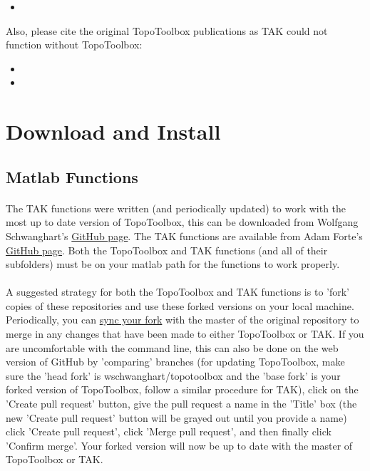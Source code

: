 \begin{itemize}
	\item {}
\end{itemize}

Also, please cite the original TopoToolbox publications as TAK could not function without TopoToolbox:

\begin{itemize}
	\item {} 
	\item {}
\end{itemize}

\section{Download and Install} \label{sec:dwnld}

\subsection{Matlab Functions}

\paragraph{}The TAK functions were written (and periodically updated) to work with the most up to date version of TopoToolbox, this can be downloaded from Wolfgang Schwanghart's \href{https://github.com/wschwanghart/topotoolbox}{GitHub page}. The TAK functions are available from Adam Forte's \href{https://github.com/amforte/Topographic-Analysis-Kit}{GitHub page}. Both the TopoToolbox and TAK functions (and all of their subfolders) must be on your matlab path for the functions to work properly.

\paragraph{}A suggested strategy for both the TopoToolbox and TAK functions is to 'fork' copies of these repositories and use these forked versions on your local machine. Periodically, you can \href{https://help.github.com/articles/syncing-a-fork/}{sync your fork} with the master of the original repository to merge in any changes that have been made to either TopoToolbox or TAK. If you are uncomfortable with the command line, this can also be done on the web version of GitHub by 'comparing' branches (for updating TopoToolbox, make sure the 'head fork' is wschwanghart/topotoolbox and the 'base fork' is your forked version of TopoToolbox, follow a similar procedure for TAK), click on the 'Create pull request' button, give the pull request a name in the 'Title' box (the new 'Create pull request' button will be grayed out until you provide a name) click 'Create pull request', click 'Merge pull request', and then finally click 'Confirm merge'. Your forked version will now be up to date with the master of TopoToolbox or TAK.

